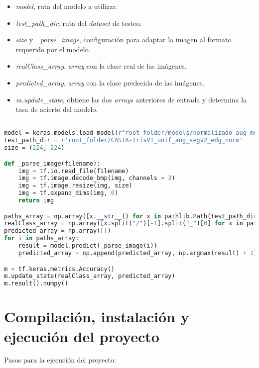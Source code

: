 {\begin{itemize}
    \item \textit{model}, ruta del modelo a utilizar.
    \item \textit{test\_path\_dir}, ruta del \textit{dataset} de testeo.
    \item \textit{size} y \textit{\_parse\_image}, configuración para adaptar la imagen al formato requerido por el modelo.
    \item \textit{realClass\_array}, \textit{array} con la clase real de las imágenes.
    \item \textit{predicted\_array}, \textit{array} con la clase predecida de las imágenes.
    \item \textit{m.update\_state}, obtiene las dos \textit{arrays} anteriores de entrada y determina la tasa de acierto del modelo.
\end{itemize}

\begin{lstlisting}[language=Python] 

model = keras.models.load_model(r"root_folder/models/normalizado_aug_modelv1")
test_path_dir = r'root_folder/CASIA-IrisV1_unif_aug_segv2_edg_norm'
size = (224, 224)

def _parse_image(filename):
    img = tf.io.read_file(filename)
    img = tf.image.decode_bmp(img, channels = 3)
    img = tf.image.resize(img, size)
    img = tf.expand_dims(img, 0)
    return img

paths_array = np.array([x.__str__() for x in pathlib.Path(test_path_dir).rglob('*.bmp')])
realClass_array = np.array([x.split("/")[-1].split("_")[0] for x in paths_array]).astype(int)
predicted_array = np.array([])
for i in paths_array:
    result = model.predict(_parse_image(i))
    predicted_array = np.append(predicted_array, np.argmax(result) + 1)

m = tf.keras.metrics.Accuracy()
m.update_state(realClass_array, predicted_array)
m.result().numpy()

\end{lstlisting}

\section{Compilación, instalación y ejecución del proyecto}

Pasos para la ejecución del proyecto:

}
